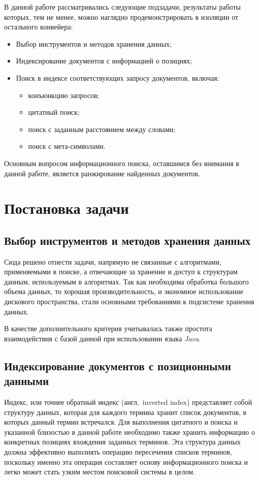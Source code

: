 \documentclass[12pt]{article}
\begin{document}
В данной работе рассматривались следующие подзадачи, результаты работы
которых, тем не менее, можно наглядно продемонстрировать в изоляции от 
остального конвейера:
\begin{itemize}
\item Выбор инструментов и методов хранения данных;
\item Индексирование документов с информацией о позициях;
\item Поиск в индексе соответствующих запросу документов, включая:
    \begin{itemize}
        \item конъюнкцию запросов;
        \item цитатный поиск;
        \item поиск с заданным расстоянием между словами;
        \item поиск с мета-символами.
    \end{itemize}
\end{itemize}

Основным вопросом информационного поиска, оставшимся без внимания в данной работе, является ранжирование найденных документов.

\section{Постановка задачи}
\subsection{Выбор инструментов и методов хранения данных}
Сюда решено отнести задачи, напрямую не связанные с алгоритмами,
применяемыми в поиске, а отвечающие за хранение и доступ к структурам данным,
используемым в алгоритмах. Так как необходима обработка 
большого объема данных, то хорошая производительность, и экономное использование 
дискового пространства, стали основными требованиями к подсистеме хранения данных.

В качестве дополнительного критерия учитывалась также простота взаимодействия с 
базой данной при использовании языка \emph{Java}.

\subsection{Индексирование документов с позиционными данными}
Индекс, или точнее обратный индекс (англ.~inverted index) представляет собой структуру
данных, которая для каждого термина хранит список документов, в которых данный термин 
встречался. Для выполнения цитатного и поиска и указанной близостью в данной работе
необходимо также хранить информацию о конкретных позициях вхождения заданных терминов.
Эта структура данных должна эффективно выполнять операцию пересечения списков терминов, 
поскольку именно эта операция составляет основу информационного поиска и легко может стать
узким местом поисковой системы в целом.
\end{document}
